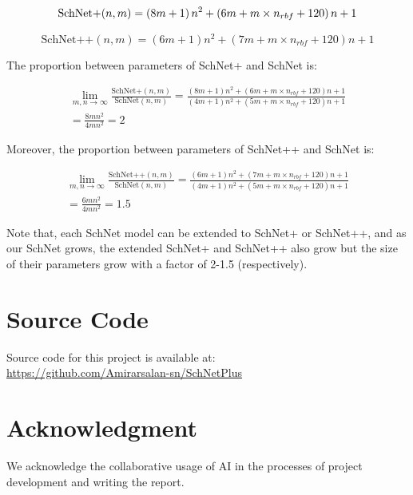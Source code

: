\documentclass[sigconf, nonacm]{acmart}
\begin{document}
\begin{equation}
	\text{SchNet+}(n,m) = \left(8m+1\right)n^2 + \left(6m + m\times n_{rbf} + 120\right)n + 1 \\
\end{equation}

\begin{equation}
	\text{SchNet++}(n,m) = \left(6m+1\right)n^2 + \left(7m + m\times n_{rbf} + 120\right)n + 1
\end{equation}

The proportion between parameters of SchNet+ and SchNet is:

\begin{equation}
	\begin{split}
	 \lim_{m,n\rightarrow \infty} \frac{\text{SchNet+}(n, m)}{\text{SchNet}(n,m)} = \frac{\left(8m+1\right)n^2 + \left(6m + m\times n_{rbf} + 120\right)n + 1}{\left(4m+1\right)n^2 + \left(5m + m\times n_{rbf} + 120\right)n + 1} \\ = \frac{8mn^2}{4mn^2} = 2
	\end{split}
\end{equation}

Moreover, the proportion between parameters of SchNet++ and SchNet is:

\begin{equation}
	\begin{split}
		\lim_{m,n\rightarrow \infty} \frac{\text{SchNet++}(n, m)}{\text{SchNet}(n,m)} = \frac{\left(6m+1\right)n^2 + \left(7m + m\times n_{rbf} + 120\right)n + 1}{\left(4m+1\right)n^2 + \left(5m + m\times n_{rbf} + 120\right)n + 1} \\ = \frac{6mn^2}{4mn^2} = 1.5
	\end{split}
\end{equation}

Note that, each SchNet model can be extended to SchNet+ or SchNet++, and as our SchNet grows, the extended SchNet+ and SchNet++ also grow but the size of their parameters grow with a factor of 2-1.5 (respectively). 

\section{Source Code}
\label{SourceCode}
Source code for this project is available at:
\\
\hyperlink{https://github.com/Amirarsalan-sn/SchNetPlus}{https://github.com/Amirarsalan-sn/SchNetPlus}

\section{Acknowledgment}
We acknowledge the collaborative usage of AI in the processes of project development and writing the report.
\end{document}
